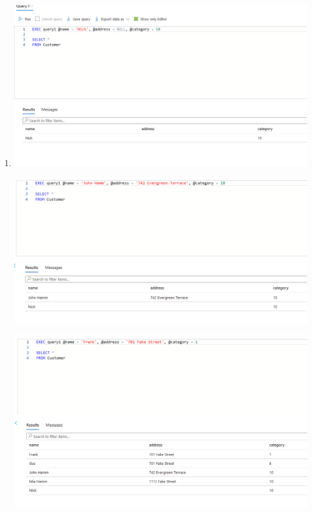 \documentclass[11pt]{article}
\begin{document}
\begin{enumerate}
\item 
\includegraphics[width = \textwidth]{insertCust1.png}

\includegraphics[width = \textwidth]{insertCust2.png}

\includegraphics[width = \textwidth]{insertCust3.png}



\end{enumerate}
\end{document}
